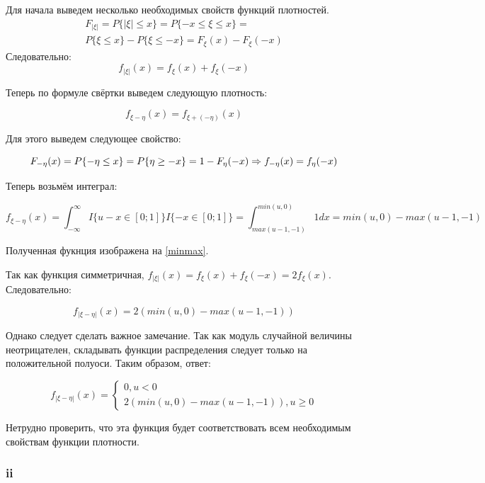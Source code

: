 \documentclass[a4paper,12pt]{article}
\begin{document}
Для начала выведем несколько необходимых свойств функций плотностей.
\begin{equation}
\begin{aligned}
	F_{|\xi|} = P\{|\xi| \le x\}  = P\{-x \le \xi \le x \} =\\ P\{\xi \le x \} - P\{\xi \le -x \} = F_\xi(x) - F_\xi(-x) 
\end{aligned}
\end{equation}
Следовательно:
 \[ f_{|\xi|}(x) = f_\xi(x) + f_\xi(-x) \] 
 
 Теперь по формуле свёртки выведем следующую плотность:
 
 \[ f_{\xi - \eta}(x) = f_{\xi + (-\eta)}(x) \]
 
Для этого выведем следующее свойство:

 
\[  F_{-\eta}(x) = P\{-\eta \le x\} = P\{\eta \ge -x\} =\\ 1 -F_{\eta}(-x) \Rightarrow f_{-\eta}(x) = f_{\eta}(-x) \] 

Теперь возьмём интеграл:


\[  f_{\xi - \eta}(x) = \int_{-\infty}^{\infty} I\{u - x \in [0;1]\} I\{- x \in [0;1]\} = \int_{max(u-1,-1)}^{min(u,0)}1 dx = min(u,0) - max(u-1,-1) \]

Полученная фукнция изображена на \ref{minmax}.

Так как функция симметричная, $ f_{|\xi|}(x) = f_\xi(x) + f_\xi(-x) = 2 f_\xi(x) $. Следовательно: 

\[  f_{|\xi - \eta|}(x) = 2(min(u,0) - max(u-1,-1))  \]

Однако следует сделать важное замечание. Так как модуль случайной величины неотрицателен, складывать функции распределения следует только на положительной полуоси. Таким образом, ответ:

\[  f_{|\xi - \eta|}(x) = 
\begin{cases}
0, u < 0\\
2(min(u,0) - max(u-1,-1)), u \ge 0
\end{cases}
 \]
 
 Нетрудно проверить, что эта функция будет соответствовать всем необходимым свойствам функции плотности.


\subsubsection{ii}
\end{document}

